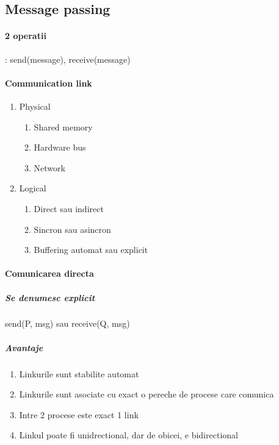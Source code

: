 \documentclass{article}
\begin{document}
\subsection*{Message passing}
\paragraph*{2 operatii}: send(message), receive(message)
\paragraph*{Communication link}
\begin{enumerate}
    \item Physical
          \begin{enumerate}
              \item Shared memory
              \item Hardware bus
              \item Network
          \end{enumerate}
    \item Logical
          \begin{enumerate}
              \item Direct sau indirect
              \item Sincron sau asincron
              \item Buffering automat sau explicit
          \end{enumerate}
\end{enumerate}

\paragraph*{Comunicarea directa}
\subparagraph*{Se denumesc explicit} send(P, msg) sau receive(Q, msg)
\subparagraph*{Avantaje}
\begin{enumerate}
    \item Linkurile sunt stabilite automat
    \item Linkurile sunt asociate cu exact o pereche de procese care comunica
    \item Intre 2 procese este exact 1 link
    \item Linkul poate fi unidrectional, dar de obicei, e bidirectional
\end{enumerate}
\end{document}
